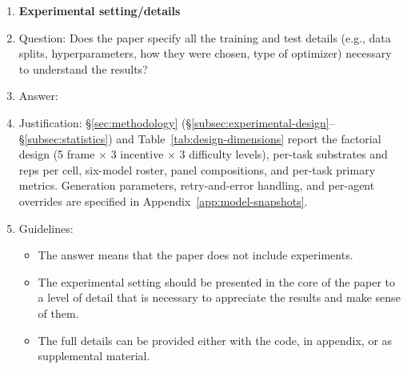 \documentclass{article}
\begin{document}
\begin{enumerate}
\item {\bf Experimental setting/details}
    \item[] Question: Does the paper specify all the training and test details (e.g., data splits, hyperparameters, how they were chosen, type of optimizer) necessary to understand the results?
    \item[] Answer: \answerYes{} %
    \item[] Justification: \S\ref{sec:methodology} (\S\ref{subsec:experimental-design}--\S\ref{subsec:statistics}) and Table~\ref{tab:design-dimensions} report the factorial design (5 frame $\times$ 3 incentive $\times$ 3 difficulty levels), per-task substrates and reps per cell, six-model roster, panel compositions, and per-task primary metrics. Generation parameters, retry-and-error handling, and per-agent overrides are specified in Appendix~\ref{app:model-snapshots}.
    \item[] Guidelines:
    \begin{itemize}
        \item The answer \answerNA{} means that the paper does not include experiments.
        \item The experimental setting should be presented in the core of the paper to a level of detail that is necessary to appreciate the results and make sense of them.
        \item The full details can be provided either with the code, in appendix, or as supplemental material.
    \end{itemize}


\end{enumerate}
\end{document}
